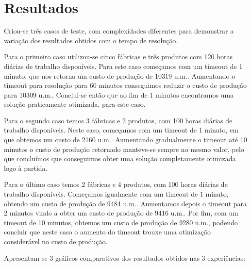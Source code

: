\documentclass[runningheads,a4paper]{llncs}
\begin{document}
\section{Resultados}

Criou-se três casos de teste, com complexidades diferentes para demonstrar a variação dos resultados obtidos com o tempo de resolução. 

Para o primeiro caso utilizou-se cinco fábricas e três produtos com 120 horas diárias de trabalho disponíveis. Para este caso começamos com um timeout de 1 minuto, que nos retorna um custo de produção de 10319 u.m.. Aumentando o timeout para resolução para 60 minutos conseguimos reduzir o custo de produção para 10309 u.m.. Conclui-se então que ao fim de 1 minutos encontramos uma solução praticamente otimizada, para este caso. 

Para o segundo caso temos 3 fábricas e 2 produtos, com 100 horas diárias de trabalho disponíveis. Neste caso, começamos com um timeout de 1 minuto, em que obtemos um custo de 2160 u.m.. Aumentando gradualmente o timeout até 10 minutos o custo de produção retornado manteve-se sempre no mesmo valor, pelo que concluímos que conseguimos obter uma solução completamente otimizada logo à partida.

Para o último caso temos 2 fábricas e 4 produtos, com 100 horas diárias de trabalho disponíveis. Começamos igualmente com um timeout de 1 minuto, obtendo um custo de produção de 9484 u.m.. Aumentamos depois o timeout para 2 minutos vindo a obter um custo de produção de 9416 u.m.. Por fim, com um timeout de 10 minutos, obtemos um custo de produção de 9280 u.m., podendo concluir que neste caso o aumento do timeout trouxe uma otimização considerável no custo de produção. 


Apresentam-se 3 gráficos comparativos dos resultados obtidos nas 3 experiências: 
\end{document}
